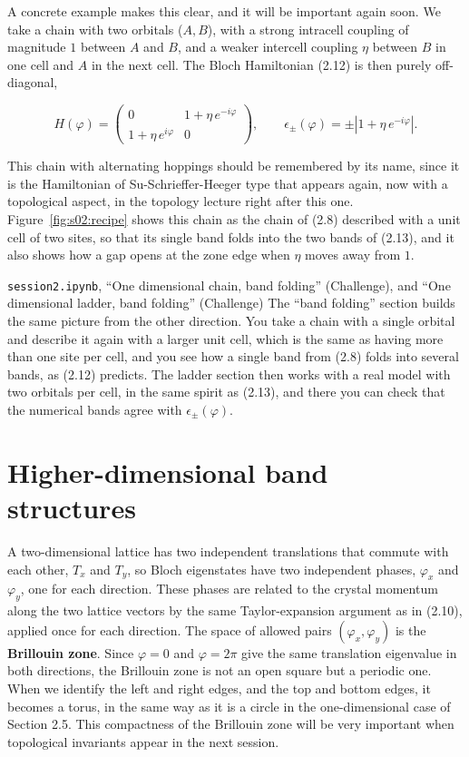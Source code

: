 A concrete example makes this clear, and it will be important again soon. We take a chain with two
orbitals ($A,B$), with a strong intracell coupling of magnitude $1$ between $A$ and $B$, and a weaker
intercell coupling $\eta$ between $B$ in one cell and $A$ in the next cell. The Bloch Hamiltonian
(2.12) is then purely off-diagonal,

\begin{equation}H(\varphi) = \begin{pmatrix} 0 & 1+\eta\,e^{-i\varphi} \\ 1+\eta\,e^{i\varphi} & 0 \end{pmatrix},
\qquad \epsilon_\pm(\varphi) = \pm\left|1+\eta\,e^{-i\varphi}\right|.\end{equation}

This chain with alternating hoppings should be remembered by its name, since it is the Hamiltonian of
Su-Schrieffer-Heeger type that appears again, now with a topological aspect, in the topology lecture
right after this one. Figure~\ref{fig:s02:recipe} shows this chain as the chain of (2.8) described
with a unit cell of two sites, so that its single band folds into the two bands of (2.13), and it
also shows how a gap opens at the zone edge when $\eta$ moves away from $1$.



\begin{notebookbox}{\texttt{session2.ipynb}, ``One dimensional chain, band folding'' (Challenge), and ``One dimensional ladder, band folding'' (Challenge)}
The ``band folding'' section builds the same picture from the other direction. You take a chain
with a single orbital and describe it again with a larger unit cell, which is the same as having more
than one site per cell, and you see how a single band from (2.8) folds into several bands, as (2.12)
predicts. The ladder section then works with a real model with two orbitals per cell, in the same
spirit as (2.13), and there you can check that the numerical bands agree with $\epsilon_\pm(\varphi)$.
\end{notebookbox}

\section{Higher-dimensional band structures}

A two-dimensional lattice has two independent translations that commute with each other, $T_x$ and
$T_y$, so Bloch eigenstates have two independent phases, $\varphi_x$ and $\varphi_y$, one for each
direction. These phases are related to the crystal momentum along the two lattice vectors by the same
Taylor-expansion argument as in (2.10), applied once for each direction. The space of allowed pairs
$(\varphi_x,\varphi_y)$ is the \textbf{Brillouin zone}. Since $\varphi=0$ and $\varphi=2\pi$ give the
same translation eigenvalue in both directions, the Brillouin zone is not an open square but a
periodic one. When we identify the left and right edges, and the top and bottom edges, it becomes a
torus, in the same way as it is a circle in the one-dimensional case of Section 2.5. This compactness
of the Brillouin zone will be very important when topological invariants appear in the next session.

